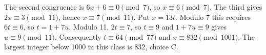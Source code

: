The second congruence is $6x+6\equiv0\pmod7$, so $x\equiv6\pmod7$. The third gives $2x\equiv3\pmod{11}$, hence $x\equiv7\pmod{11}$. Put $x=13t$. Modulo 7 this requires $6t\equiv6$, so $t=1+7u$. Modulo 11, $2t\equiv7$, so $t\equiv9$ and $1+7u\equiv9$ gives $u\equiv9\pmod{11}$. Consequently $t\equiv64\pmod{77}$ and $x\equiv832\pmod{1001}$. The largest integer below 1000 in this class is $\boxed{832}$, choice C.
